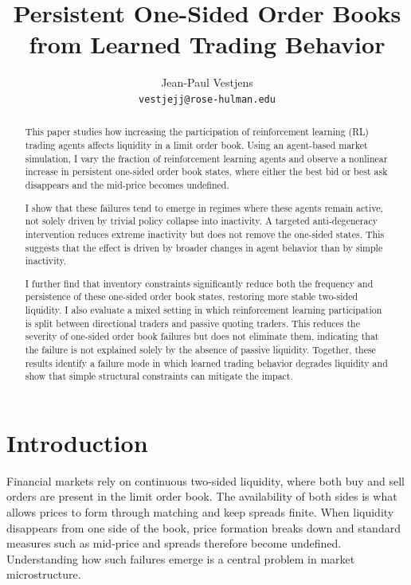 \documentclass[sigconf]{acmart}
\title{Persistent One-Sided Order Books from Learned Trading Behavior}
\author{Jean-Paul Vestjens \\ \texttt{vestjejj@rose-hulman.edu}}
\date{}
\begin{document}
\begin{abstract}
This paper studies how increasing the participation of reinforcement learning (RL) trading agents affects liquidity in a limit order book. Using an agent-based market simulation, I vary the fraction of reinforcement learning agents and observe a nonlinear increase in persistent one-sided order book states, where either the best bid or best ask disappears and the mid-price becomes undefined.

I show that these failures tend to emerge in regimes where these agents remain active, not solely driven by trivial policy collapse into inactivity. A targeted anti-degeneracy intervention reduces extreme inactivity but does not remove the one-sided states. This suggests that the effect is driven by broader changes in agent behavior than by simple inactivity.

I further find that inventory constraints significantly reduce both the frequency and persistence of these one-sided order book states, restoring more stable two-sided liquidity. I also evaluate a mixed setting in which reinforcement learning participation is split between directional traders and passive quoting traders. This reduces the severity of one-sided order book failures but does not eliminate them, indicating that the failure is not explained solely by the absence of passive liquidity. Together, these results identify a failure mode in which learned trading behavior degrades liquidity and show that simple structural constraints can mitigate the impact.
\end{abstract}

\maketitle

\section{Introduction}

Financial markets rely on continuous two-sided liquidity, where both buy and sell orders are present in the limit order book. The availability of both sides is what allows prices to form through matching and keep spreads finite. When liquidity disappears from one side of the book, price formation breaks down and standard measures such as mid-price and spreads therefore become undefined. Understanding how such failures emerge is a central problem in market microstructure.
\end{document}
